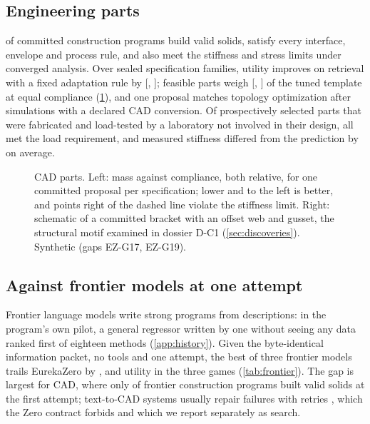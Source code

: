 \subsection{Engineering parts}

\syn[EZ-G05]{\EZbuildC\%} of committed construction programs build valid solids,
\syn[EZ-G05]{\EZcomplyC\%} satisfy every interface, envelope and process rule, and
\syn[EZ-G05]{\EZfeasC\%} also meet the stiffness and stress limits under converged analysis. Over
\syn[EZ-G20]{\EZnC} sealed specification families, utility improves on retrieval with a fixed adaptation
rule by \syn[EZ-G05]{\EZdC} [\syn[EZ-G05]{\EZdClo}, \syn[EZ-G05]{\EZdChi}]; feasible parts weigh
\syn[EZ-G19]{\EZmassC} [\syn[EZ-G19]{\EZmassClo}, \syn[EZ-G19]{\EZmassChi}] of the tuned template at
equal compliance (\cref{fig:cad}), and one proposal matches topology optimization after
\syn[EZ-G06]{\EZbeqC} simulations with a declared CAD conversion. Of
\syn[EZ-G17]{\EZphysN} prospectively selected parts that were fabricated and load-tested by a laboratory
not involved in their design, all met the load requirement, and measured stiffness differed from the
prediction by \syn[EZ-G17]{\EZphysErr\%} on average.

\begin{figure}[t]
\centering

\caption{CAD parts. Left: mass against compliance, both relative, for one committed proposal per
specification; lower and to the left is better, and points right of the dashed line violate the
stiffness limit. Right: schematic of a committed bracket with an offset web and gusset, the structural
motif examined in dossier D-C1 (\cref{sec:discoveries}). Synthetic (gaps EZ-G17, EZ-G19).}
\label{fig:cad}
\end{figure}

\subsection{Against frontier models at one attempt}

Frontier language models write strong programs from descriptions: in the program's own pilot, a
general regressor written by one without seeing any data ranked first of eighteen methods \pre{}
(\cref{app:history}). Given the byte-identical information packet, no tools and one attempt, the best of
three frontier models trails EurekaZero by \syn[EZ-G07]{\EZfrA}, \syn[EZ-G07]{\EZfrB} and
\syn[EZ-G07]{\EZfrC} utility in the three games (\cref{tab:frontier}). The gap is largest for CAD,
where only \syn[EZ-G07]{\EZfrValidC\%} of frontier construction programs built valid solids at the
first attempt; text-to-CAD systems usually repair failures with retries \citep{wang2026text2cadbench},
which the Zero contract forbids and which we report separately as search.

